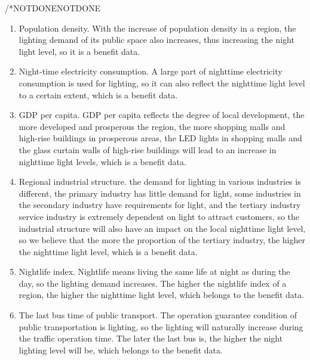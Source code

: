 /*NOTDONENOTDONE
\begin{enumerate}
    \item Population density. With the increase of population density in a region, the lighting demand of its public space also increases, thus increasing the night light level, so it is a benefit data. 
 
    \item Night-time electricity consumption. A large part of nighttime electricity consumption is used for lighting, so it can also reflect the nighttime light level to a certain extent, which is a benefit data. 
     
    \item GDP per capita. GDP per capita reflects the degree of local development, the more developed and prosperous the region, the more shopping malls and high-rise buildings in prosperous areas, the LED lights in shopping malls and the glass curtain walls of high-rise buildings will lead to an increase in nighttime light levels, which is a benefit data. 
     
    \item Regional industrial structure. the demand for lighting in various industries is different, the primary industry has little demand for light, some industries in the secondary industry have requirements for light, and the tertiary industry service industry is extremely dependent on light to attract customers, so the industrial structure will also have an impact on the local nighttime light level, so we believe that the more the proportion of the tertiary industry, the higher the nighttime light level, which is a benefit data. 
     
    \item Nightlife index. Nightlife means living the same life at night as during the day, so the lighting demand increases. The higher the nightlife index of a region, the higher the nighttime light level, which belongs to the benefit data.
    
    \item The last bus time of public transport. The operation guarantee condition of public transportation is lighting, so the lighting will naturally increase during the traffic operation time. The later the last bus is, the higher the night lighting level will be, which belongs to the benefit data.
\end{enumerate}

